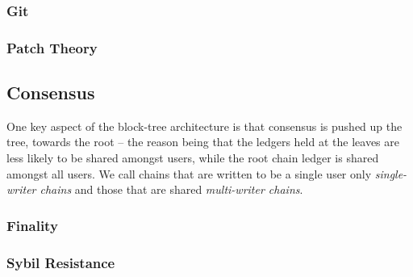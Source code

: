 \subsubsection{Git}
\subsubsection{Patch Theory}

\subsection{Consensus}
\label{consensus}

One key aspect of the block-tree architecture is that consensus is pushed up
the tree, towards the root -- the reason being that the ledgers held at the
leaves are less likely to be shared amongst users, while the root chain ledger
is shared amongst all users.  We call chains that are written to be a single
user only \emph{single-writer chains} and those that are shared
\emph{multi-writer chains}.

\subsubsection{Finality}
\label{finality}

\subsubsection{Sybil Resistance}
\label{sybil-resistance}
